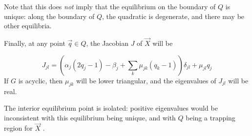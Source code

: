 \documentclass{article}
\begin{document}
Note that this does \emph{not} imply that the equilibrium on the boundary of $Q$
is unique: along the boundary of $Q$, the quadratic is degenerate, and there may
be other equilibria.

Finally, at any point $\vec{q} \in Q$, the Jacobian $J$ of $\vec{X}$ will be

\begin{equation}
    J_{jl} = \left(\alpha_j (2 q_j - 1) - \beta_j + \sum_k \mu_{jk} (q_k - 1)
    \right) \delta_{jl} + \mu_{jl} q_j
\end{equation}
If $G$ is acyclic, then $\mu_{jk}$ will be lower triangular, and the eigenvalues
of $J_{jl}$ will be real.

The interior equilibrium point is isolated: positive eigenvalues would be
inconsistent with this equilibrium being unique, and with $Q$ being a trapping
region for $\vec{X}$ \cite{frame2021mathematical}. 
\end{document}
